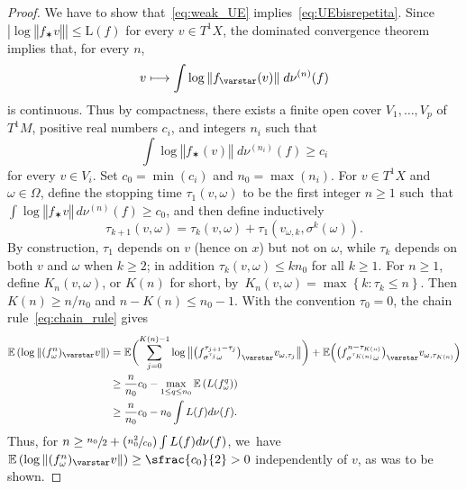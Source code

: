 \documentclass[JEP,XML,SOM,Unicode,published]{cedram}
\newcommand\mto{\mathchoice{\longmapsto}{\mapsto}{\mapsto}{\mapsto}}
\newcommand{\Psfrac}[2]{(\sfrac{#1}{#2})}
\let\sep :
\newcommand{\set}[1]{\left\{#1\right\}}
\newcommand{\norm}[1]{{\left\Vert#1\right\Vert}}
\newcommand{\bnorm}[1]{{\bigl\Vert#1\bigr\Vert}}
\newcommand{\abs}[1]{\left\vert#1\right\vert}
\newcommand{\lrpar}[1]{\left(#1\right)}
\newcommand{\blrpar}[1]{\bigl(#1\bigr)}
\newcommand{\Blrpar}[1]{\Bigl(#1\Bigr)}
\newcommand{\bblrpar}[1]{\biggl(#1\biggr)}
\newcommand{\ee}{\mathbb{E}}
\theoremstyle{plain}
\theoremstyle{definition}
\begin{document}
\begin{proof} We have to show that~\eqref{eq:weak_UE} implies~\eqref{eq:UEbisrepetita}.
Since $\abs{\log \norm{f_{\varstar}v}} \leq \mathrm L(f)$ for every $v\in T^1X$, the
dominated convergence theorem implies that, for every $n$,
\begin{equation*}
v\mto \int \log \norm {f_{\varstar}( v)} \; d\nu^{(n)}(f)
\end{equation*}
is continuous.
Thus by compactness, there exists a finite open cover $V_1, \ldots, V_p$ of $T^1M$, positive
real numbers $c_i$, and integers
$n_i$ such that
\begin{equation*}
\int \log \norm{f_\varstar ( v) } \; d\nu^{(n_i)}(f) \geq c_i
\end{equation*}
for every
$ v\!\in\! V_i$.
Set $c_0 \!=\! \min(c_i)$ and $n_0 \!=\! \max(n_i)$. For $ v\in T^1X$ and
$\omega\in \Omega$, define the stopping time $\tau_1( v, \omega)$ to
be the first integer $n\!\geq\! 1$ such~that~\hbox{$\int \log \norm{f_\varstar v } \, d\nu^{(n)}(f) \!\geq\! c_0$}, and then define inductively
\begin{equation*}
\tau_{k+1}( v, \omega) = \tau_k( v, \omega) + \tau_1( v_{\omega, k}, \sigma^k (\omega)).
\end{equation*}
By construction, $\tau_1$ depends on $v$ (hence on $x$) but not on $\omega$,
while $\tau_k$ depends on both $v$ and $\omega$ when $k\geq 2$; in addition
$\tau_k(v,\omega)\leq k n_0$ for all $k\geq 1$. For $n\geq 1$, define
$K_n( v,\omega)$, or $K(n)$ for short, by~$K_n( v,\omega)=\max\set{k \sep \tau_k \leq n}$. Then
$K(n) \geq n/n_0$ and $n- K(n)\leq n_0-1$.
With the convention $\tau_0 = 0$, the chain rule~\eqref{eq:chain_rule} gives
\begin{align*}\label{eq:stopping_bdd}
\notag\ee\lrpar{\log\norm{(f^n_\omega)_\varstar v}} &= \ee\bblrpar{\sum_{j = 0}^{K(n) -1} \log\bnorm{\blrpar{f_{\sigma^{\tau_j}\omega}^{\tau_{j+1} - \tau_j} }_\varstar v_{\omega, \tau_j}}} +
\ee\Blrpar{ \blrpar{f_{\sigma^{\tau_{K(n)}}\omega}^{n- \tau_{K(n)}} }_\varstar v_{\omega, \tau_{K(n)}}} \\
&\geq \frac{n}{n_0}c_0 - \max_{1\leq q\leq n_0} \ee\lrpar{ L (f_\omega^q) } \\
&\geq \frac{n}{n_0}c_0 - n_0 \int L(f)d\nu(f).
\end{align*}
Thus, for $n\geq \sfrac{n_0}{2} + \Psfrac{n_0^2}{c_0}\int L(f)d\nu(f)$, we~have $\ee\lrpar{\log\norm{(f^n_\omega)_\varstar v}} \geq \sfrac{c_0}{2}>0$ independently of $ v$, as was to be shown.
\end{proof}
\end{document}
